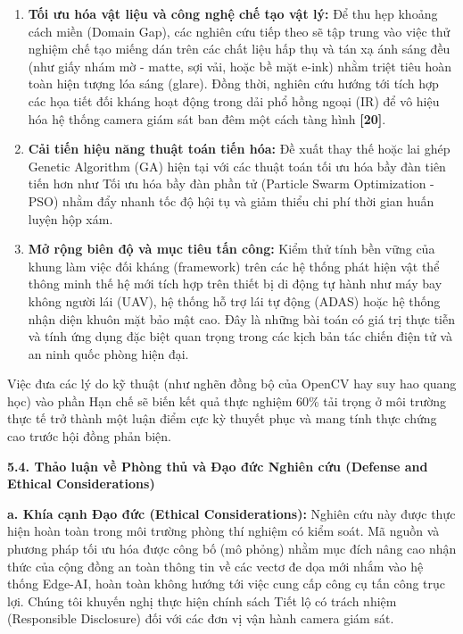 \begin{enumerate}
\def\labelenumi{\arabic{enumi}.}
\item
  \textbf{Tối ưu hóa vật liệu và công nghệ chế tạo vật lý:} Để thu hẹp
  khoảng cách miền (Domain Gap), các nghiên cứu tiếp theo sẽ tập trung
  vào việc thử nghiệm chế tạo miếng dán trên các chất liệu hấp thụ và
  tán xạ ánh sáng đều (như giấy nhám mờ - matte, sợi vải, hoặc bề mặt
  e-ink) nhằm triệt tiêu hoàn toàn hiện tượng lóa sáng (glare). Đồng
  thời, nghiên cứu hướng tới tích hợp các họa tiết đối kháng hoạt động
  trong dải phổ hồng ngoại (IR) để vô hiệu hóa hệ thống camera giám sát
  ban đêm một cách tàng hình \textbf{{[}20{]}}.
\item
  \textbf{Cải tiến hiệu năng thuật toán tiến hóa:} Đề xuất thay thế hoặc
  lai ghép Genetic Algorithm (GA) hiện tại với các thuật toán tối ưu hóa
  bầy đàn tiên tiến hơn như Tối ưu hóa bầy đàn phần tử (Particle Swarm
  Optimization - PSO) nhằm đẩy nhanh tốc độ hội tụ và giảm thiểu chi phí
  thời gian huấn luyện hộp xám.
\item
  \textbf{Mở rộng biên độ và mục tiêu tấn công:} Kiểm thử tính bền vững
  của khung làm việc đối kháng (framework) trên các hệ thống phát hiện
  vật thể thông minh thế hệ mới tích hợp trên thiết bị di động tự hành
  như máy bay không người lái (UAV), hệ thống hỗ trợ lái tự động (ADAS)
  hoặc hệ thống nhận diện khuôn mặt bảo mật cao. Đây là những bài toán
  có giá trị thực tiễn và tính ứng dụng đặc biệt quan trọng trong các
  kịch bản tác chiến điện tử và an ninh quốc phòng hiện đại.
\end{enumerate}

Việc đưa các lý do kỹ thuật (như nghẽn đồng bộ của OpenCV hay suy hao
quang học) vào phần Hạn chế sẽ biến kết quả thực nghiệm 60\% tải trọng ở
môi trường thực tế trở thành một luận điểm cực kỳ thuyết phục và mang
tính thực chứng cao trước hội đồng phản biện.

\textbf{5.4. Thảo luận về Phòng thủ và Đạo đức Nghiên cứu (Defense and
Ethical Considerations)}

\textbf{a. Khía cạnh Đạo đức (Ethical Considerations):} Nghiên cứu này
được thực hiện hoàn toàn trong môi trường phòng thí nghiệm có kiểm soát.
Mã nguồn và phương pháp tối ưu hóa được công bố (mô phỏng) nhằm mục đích
nâng cao nhận thức của cộng đồng an toàn thông tin về các vectơ đe dọa
mới nhắm vào hệ thống Edge-AI, hoàn toàn không hướng tới việc cung cấp
công cụ tấn công trục lợi. Chúng tôi khuyến nghị thực hiện chính sách
Tiết lộ có trách nhiệm (Responsible Disclosure) đối với các đơn vị vận
hành camera giám sát.

